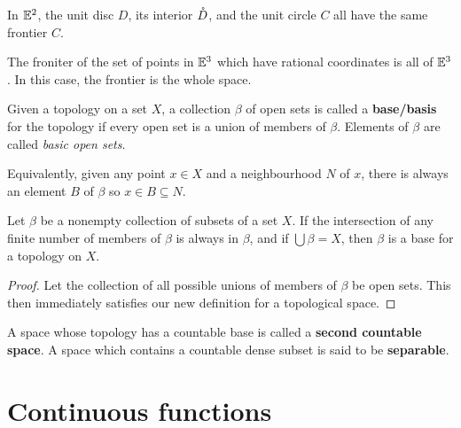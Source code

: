 \begin{example}
    In $\mathbb{E}^2$, the unit disc $D$, its interior $\mathring{D}$, and the unit circle $C$ all have the same frontier $C$.

    The froniter of the set of points in $\mathbb{E}^3$ which have rational coordinates is all of $\mathbb{E}^3$. In this case, the frontier is the whole space.
\end{example}
\begin{definition}
    Given a topology on a set $X$, a collection $\beta$ of open sets is called a \textbf{base/basis} for the topology if every open set is a union of members of $\beta$. Elements of $\beta$ are called \emph{basic open sets}.

    Equivalently, given any point $x \in X$ and a neighbourhood $N$ of $x$, there is always an element $B$ of $\beta$ so $x\in B\subseteq N$.
\end{definition}
\begin{theorem}
    Let $\beta$ be a nonempty collection of subsets of a set $X$. If the intersection of any finite number of members of $\beta$ is always in $\beta$, and if $\bigcup\beta=X$, then $\beta$ is a base for a topology on $X$.
\end{theorem}
\begin{proof}
    Let the collection of all possible unions of members of $\beta$ be open sets. This then immediately satisfies our new definition for a topological space.
\end{proof}
\begin{remark}
    A space whose topology has a countable base is called a \textbf{second countable space}. A space which contains a countable dense subset is said to be \textbf{separable}.
\end{remark}

\section{Continuous functions}

